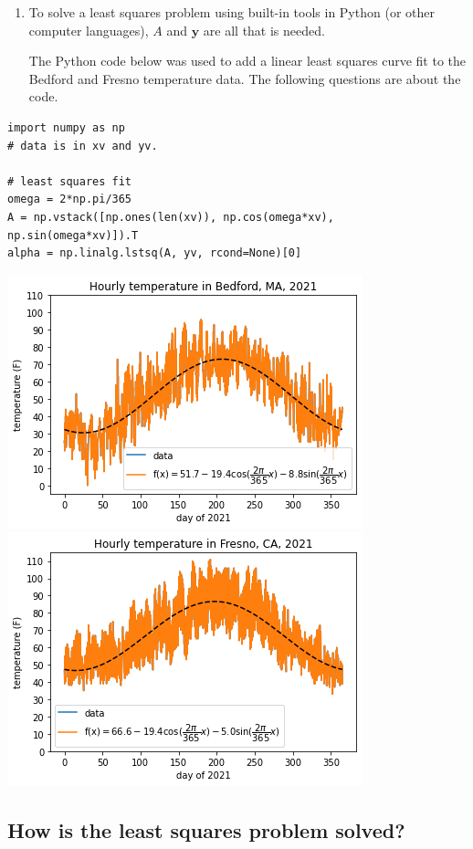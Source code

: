 \documentclass[12pt,letterpaper,noanswers]{exam}
\newcommand{\vc}[1]{\boldsymbol{#1}}
\begin{document}
\begin{enumerate}[resume=classQ]
    \item To solve a least squares problem using built-in tools in Python (or other computer languages), $A$ and $\vc{y}$ are all that is needed.
    
    The Python code below was used to add a linear least squares curve fit to the Bedford and Fresno temperature data.  The following questions are about the code.
\end{enumerate}
\begin{verbatim}
import numpy as np
# data is in xv and yv.

# least squares fit
omega = 2*np.pi/365
A = np.vstack([np.ones(len(xv)), np.cos(omega*xv), np.sin(omega*xv)]).T
alpha = np.linalg.lstsq(A, yv, rcond=None)[0]
\end{verbatim}

\includegraphics[width=0.45\linewidth]{img/C03weatherBedfordfit.png}
\includegraphics[width=0.45\linewidth]{img/C03weatherFresnofit.png}

\subsection{How is the least squares problem solved?}
\end{document}
